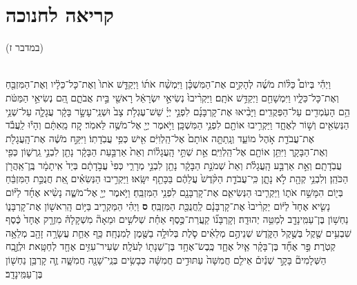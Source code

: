 \documentclass[twoside, openany, parskip=half, 11pt]{book}
\begin{document}
\begin{footnotesize}
\begin{multicols}{2}
\end{multicols}


\newcommand{\tsource}[1]{\begin{scriptsize} \textsf{(#1)} \end{scriptsize}}
\section[חנוכה]{קריאה לחנוכה}

\begin{multicols}{2}
\tsource{במדבר ז}\\
וַיְהִ֡י בְּיוֹם֩ כַּלּ֨וֹת מֹשֶׁ֜ה לְהָקִ֣ים אֶת־הַמִּשְׁכָּ֗ן וַיִּמְשַׁ֨ח אֹת֜וֹ וַיְקַדֵּ֤שׁ אֹתוֹ֙ וְאֶת־כָּל־כֵּלָ֔יו וְאֶת־הַמִּזְבֵּ֖חַ וְאֶת־כָּל־כֵּלָ֑יו וַיִּמְשָׁחֵ֖ם וַיְקַדֵּ֥שׁ אֹתָֽם׃ וַיַּקְרִ֨יבוּ֙ נְשִׂיאֵ֣י יִשְׂרָאֵ֔ל רָאשֵׁ֖י בֵּ֣ית אֲבֹתָ֑ם הֵ֚ם נְשִׂיאֵ֣י הַמַּטֹּ֔ת הֵ֥ם הָעֹֽמְדִ֖ים עַל־הַפְּקֻדִֽים׃ וַיָּבִ֨יאוּ אֶת־קָרְבָּנָ֜ם לִפְנֵ֣י יְיָ֗ שֵׁשׁ־עֶגְלֹ֥ת צָב֙ וּשְׁנֵֽי־עָשָׂ֣ר בָּקָ֔ר עֲגָלָ֛ה עַל־שְׁנֵ֥י הַנְּשִׂאִ֖ים וְשׁ֣וֹר לְאֶחָ֑ד וַיַּקְרִ֥יבוּ אוֹתָ֖ם לִפְנֵ֥י הַמִּשְׁכָּֽן׃  
וַיֹּ֥אמֶר יְיָ֖ אֶל־מֹשֶׁ֥ה לֵּאמֹֽר׃ קַ֚ח מֵֽאִתָּ֔ם וְהָי֕וּ לַֽעֲבֹ֕ד אֶת־עֲבֹדַ֖ת אֹ֣הֶל מוֹעֵ֑ד וְנָֽתַתָּ֤ה אוֹתָם֙ אֶל־הַֽלְוִיִּ֔ם אִ֖ישׁ כְּפִ֥י עֲבֹֽדָתֽוֹ׃ וַיִּקַּ֣ח מֹשֶׁ֔ה אֶת־הָֽעֲגָלֹ֖ת וְאֶת־הַבָּקָ֑ר וַיִּתֵּ֥ן אוֹתָ֖ם אֶל־הַֽלְוִיִּֽם׃ אֵ֣ת שְׁתֵּ֣י הָֽעֲגָל֗וֹת וְאֵת֙ אַרְבַּ֣עַת הַבָּקָ֔ר נָתַ֖ן לִבְנֵ֣י גֵֽרְשׁ֑וֹן כְּפִ֖י עֲבֹֽדָתָֽם׃ וְאֵ֣ת אַרְבַּ֣ע הָֽעֲגָלֹ֗ת וְאֵת֙ שְׁמֹנַ֣ת הַבָּקָ֔ר נָתַ֖ן לִבְנֵ֣י מְרָרִ֑י כְּפִי֙ עֲבֹ֣דָתָ֔ם בְּיַד֙ אִֽיתָמָ֔ר בֶּֽן־אַֽהֲרֹ֖ן הַכֹּהֵֽן׃ וְלִבְנֵ֥י קְהָ֖ת לֹ֣א נָתָ֑ן כִּֽי־עֲבֹדַ֤ת הַקֹּ֨דֶשׁ֙ עֲלֵהֶ֔ם בַּכָּתֵ֖ף יִשָּֽׂאוּ׃ וַיַּקְרִ֣יבוּ הַנְּשִׂאִ֗ים אֵ֚ת חֲנֻכַּ֣ת הַמִּזְבֵּ֔חַ בְּי֖וֹם הִמָּשַׁ֣ח אֹת֑וֹ וַיַּקְרִ֧יבוּ הַנְּשִׂיאִ֛ם אֶת־קָרְבָּנָ֖ם לִפְנֵ֥י הַמִּזְבֵּֽחַ׃ וַיֹּ֥אמֶר יְיָ֖ אֶל־מֹשֶׁ֑ה נָשִׂ֨יא אֶחָ֜ד לַיּ֗וֹם נָשִׂ֤יא אֶחָד֙ לַיּ֔וֹם יַקְרִ֨יבוּ֙ אֶת־קָרְבָּנָ֔ם לַֽחֲנֻכַּ֖ת הַמִּזְבֵּֽחַ׃ \textbf{ס}   
וַיְהִ֗י הַמַּקְרִ֛יב בַּיּ֥וֹם הָֽרִאשׁ֖וֹן אֶת־קָרְבָּנ֑וֹ נַחְשׁ֥וֹן בֶּן־עַמִּֽינָדָ֖ב לְמַטֵּ֥ה יְהוּדָֽה׃ וְקָרְבָּנ֞וֹ קַֽעֲרַת־כֶּ֣סֶף אַחַ֗ת שְׁלֹשִׁ֣ים וּמֵאָה֘ מִשְׁקָלָהּ֒ מִזְרָ֤ק אֶחָד֙ כֶּ֔סֶף שִׁבְעִ֥ים שֶׁ֖קֶל בְּשֶׁ֣קֶל הַקֹּ֑דֶשׁ שְׁנֵיהֶ֣ם מְלֵאִ֗ים סֹ֛לֶת בְּלוּלָ֥ה בַשֶּׁ֖מֶן לְמִנְחָֽה׃ כַּ֥ף אַחַ֛ת עֲשָׂרָ֥ה זָהָ֖ב מְלֵאָ֥ה קְטֹֽרֶת׃
 פַּ֣ר אֶחָ֞ד בֶּן־בָּקָ֗ר אַ֧יִל אֶחָ֛ד כֶּֽבֶשׂ־אֶחָ֥ד בֶּן־שְׁנָת֖וֹ לְעֹלָֽה׃ שְׂעִיר־עִזִּ֥ים אֶחָ֖ד לְחַטָּֽאת׃ וּלְזֶ֣בַֽח הַשְּׁלָמִים֘ בָּקָ֣ר שְׁנַ֒יִם֒ אֵילִ֤ם חֲמִשָּׁה֙ עַתּוּדִ֣ים חֲמִשָּׁ֔ה כְּבָשִׂ֥ים בְּנֵֽי־שָׁנָ֖ה חֲמִשָּׁ֑ה זֶ֛ה קָרְבַּ֥ן נַחְשׁ֖וֹן בֶּן־עַמִּֽינָדָֽב׃

 

\end{multicols}
\end{footnotesize}
\end{document}
